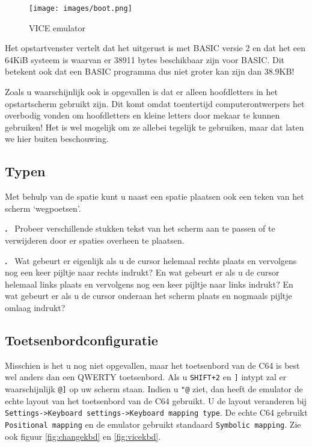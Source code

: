 \documentclass{article}
\newcounter{problem}
\newcounter{solution}
\newcommand\problem{%
  \stepcounter{problem}%
  \textbf{\theproblem.}~%
  \setcounter{solution}{0}%
}
\begin{document}
\begin{figure}
\centering
\texttt{[image: images/boot.png]}
\caption{VICE emulator}
\label{fig:vice}
\end{figure}

Het opstartvenster vertelt dat het uitgerust is met BASIC versie 2 en dat het een 64KiB systeem is waarvan er 38911 bytes beschikbaar zijn voor BASIC.
Dit betekent ook dat een BASIC programma dus niet groter kan zijn dan 38.9KB!

Zoals u waarschijnlijk ook is opgevallen is dat er alleen hoofdletters in het opstartscherm gebruikt zijn.
Dit komt omdat toentertijd computerontwerpers het overbodig vonden om hoofdletters en kleine letters door mekaar te kunnen gebruiken!
Het is wel mogelijk om ze allebei tegelijk te gebruiken, maar dat laten we hier buiten beschouwing.

\subsection{Typen}

Met behulp van de spatie kunt u naast een spatie plaatsen ook een teken van het scherm `wegpoetsen'.

\problem Probeer verschillende stukken tekst van het scherm aan te passen of te verwijderen door er spaties overheen te plaatsen.

\problem Wat gebeurt er eigenlijk als u de cursor helemaal rechts plaats en vervolgens nog een keer pijltje naar rechts indrukt?
En wat gebeurt er als u de cursor helemaal links plaats en vervolgens nog een keer pijltje naar links indrukt?
En wat gebeurt er als u de cursor onderaan het scherm plaats en nogmaals pijltje omlaag indrukt?

\subsection{Toetsenbordconfiguratie}

Misschien is het u nog niet opgevallen, maar het toetsenbord van de C64 is best wel anders dan een QWERTY toetsenbord.
Als u \verb:SHIFT+2: en \verb:]: intypt zal er waarschijnlijk \verb:@]: op uw scherm staan.
Indien u \verb:"@: ziet, dan heeft de emulator de echte layout van het toetsenbord van de C64 gebruikt.
U de layout veranderen bij \verb:Settings->Keyboard settings->Keyboard mapping type:.
De echte C64 gebruikt \verb:Positional mapping: en de emulator gebruikt standaard \verb:Symbolic mapping:.
Zie ook figuur \ref{fig:changekbd} en \ref{fig:vicekbd}.
\end{document}
